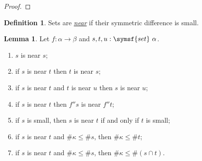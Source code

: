 \documentclass{article}
\newcommand{\cdef}[3]{\href{https://leanprover-community.github.io/con-nf/doc/ConNF/#1.html\#ConNF.#2}{\emph{#3}}}
\newcommand{\symmdiff}{\mathrel{\raisebox{1pt}{\( \mathsmaller\triangle \)}}}
\theoremstyle{definition}
\newtheorem{definition}{Definition}[section]
\newtheorem{lemma}[theorem]{Lemma}
\theoremstyle{remark}
\begin{document}
\begin{proof}
\end{proof}
\begin{definition}
    Sets are \cdef{Atom/Small}{IsNear}{near} if their symmetric difference is small.
\end{definition}
\begin{lemma}
    \label{lem:near}
    Let \( f \colon \alpha \to \beta \) and \( s, t, u : \symsf{set}\ \alpha \).
    \begin{enumerate}
        \item \( s \) is near \( s \);
        \item if \( s \) is near \( t \) then \( t \) is near \( s \);
        \item if \( s \) is near \( t \) and \( t \) is near \( u \) then \( s \) is near \( u \);
        \item if \( s \) is near \( t \) then \( f '' s \) is near \( f '' t \);
        \item if \( s \) is small, then \( s \) is near \( t \) if and only if \( t \) is small;
        \item if \( s \) is near \( t \) and \( \#\kappa \leq \#s \), then \( \#\kappa \leq \#t \);
        \item if \( s \) is near \( t \) and \( \#\kappa \leq \#s \), then \( \#\kappa \leq \#(s \cap t) \).
    \end{enumerate}
\end{lemma}
\end{document}
